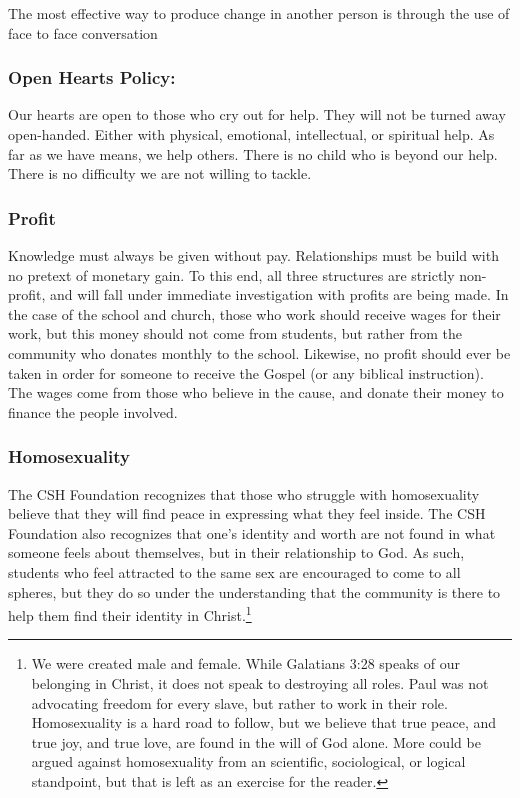 \documentclass[CSHFoundation.tex]{subfiles}
\begin{document}
The most effective way to produce change in another person is through the use of face to face conversation



\subsubsection{Open Hearts Policy:}

Our hearts are open to those who cry out for help. They will not be turned away open-handed. Either with physical, emotional, intellectual, or spiritual help. As far as we have means, we help others. There is no child who is beyond our help. There is no difficulty we are not willing to tackle.


\subsubsection{Profit}
Knowledge must always be given without pay. Relationships must be build with no pretext of monetary gain. To this end, all three structures are strictly non-profit, and will fall under immediate investigation with profits are being made. In the case of the school and church, those who work should receive wages for their work, but this money should not come from students, but rather from the community who donates monthly to the school. Likewise, no profit should ever be taken in order for someone to receive the Gospel (or any biblical instruction). The wages come from those who believe in the cause, and donate their money to finance the people involved.

\subsubsection{Homosexuality}
The CSH Foundation recognizes that those who struggle with homosexuality believe that they will find peace in expressing what they feel inside. The CSH Foundation also recognizes that one's identity and worth are not found in what someone feels about themselves, but in their relationship to God. As such, students who feel attracted to the same sex are encouraged to come to all spheres, but they do so under the understanding that the community is there to help them find their identity in Christ.\footnote{We were created male and female. While Galatians 3:28 speaks of our belonging in Christ, it does not speak to destroying all roles. Paul was not advocating freedom for every slave, but rather to work in their role. Homosexuality is a hard road to follow, but we believe that true peace, and true joy, and true love, are found in the will of God alone. More could be argued against homosexuality from an scientific, sociological, or logical standpoint, but that is left as an exercise for the reader.}
\end{document}
